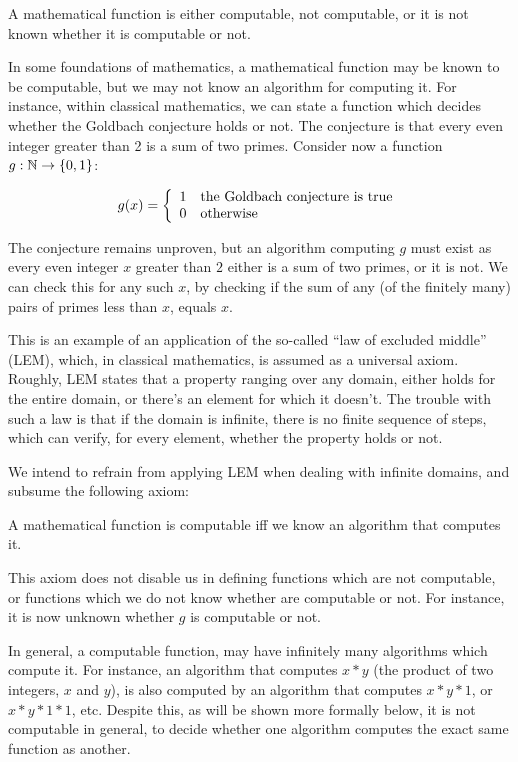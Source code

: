 \begin{textaxiom} A mathematical function is either computable, not computable,
or it is not known whether it is computable or not. \end{textaxiom}

In some foundations of mathematics, a mathematical function may be known to be
computable, but we may not know an algorithm for computing it. For instance,
within classical mathematics, we can state a function which decides whether the
Goldbach conjecture\cite{dickson-1919-goldbach} holds or not. The conjecture is
that every even integer greater than 2 is a sum of two primes.  Consider now a
function $g:\mathbb{N}\rightarrow\mathopen{}\left\{{0,1}\right\}\mathclose{}$:

$$g\mathopen{}\left({x}\right)\mathclose{} = \left\{
\begin{array}{l l}
1 & \text{the Goldbach conjecture is true} \\
0 & \text{otherwise}
\end{array}
\right.$$

The conjecture remains unproven, but an algorithm computing $g$ must exist as
every even integer $x$ greater than $2$ either is a sum of two primes, or it is
not. We can check this for any such $x$, by checking if the sum of any (of the
finitely many) pairs of primes less than $x$, equals $x$.

This is an example of an application of the so-called ``law of excluded
middle'' (LEM), which, in classical mathematics, is assumed as a universal
axiom. Roughly, LEM states that a property ranging over any domain, either
holds for the entire domain, or there's an element for which it doesn't. The
trouble with such a law is that if the domain is infinite, there is no finite
sequence of steps, which can verify, for every element, whether the property
holds or not.

We intend to refrain from applying LEM when dealing with infinite domains, and
subsume the following axiom:

\begin{textaxiom} A mathematical function is computable iff we know an
algorithm that computes it. \end{textaxiom}

This axiom does not disable us in defining functions which are not computable,
or functions which we do not know whether are computable or not. For instance,
it is now unknown whether $g$ is computable or not.

In general, a computable function, may have infinitely many algorithms which
compute it. For instance, an algorithm that computes $x*y$ (the product of two
integers, $x$ and $y$), is also computed by an algorithm that computes $x*y*1$,
or $x*y*1*1$, etc. Despite this, as will be shown more formally below, it is
not computable in general, to decide whether one algorithm computes the exact
same function as another.


